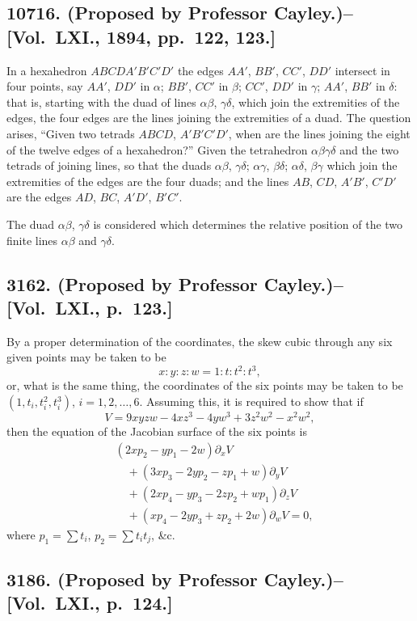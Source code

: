 \documentclass[11pt,a4paper]{article}
\theoremstyle{definition}
\begin{document}
\subsection*{10716. (Proposed by Professor Cayley.)\---[Vol.~LXI., 1894, pp.~122, 123.]}

In a hexahedron $ABCDA'B'C'D'$ the edges $AA'$, $BB'$, $CC'$, $DD'$ intersect in four points, say $AA'$, $DD'$ in $\alpha$; $BB'$, $CC'$ in $\beta$; $CC'$, $DD'$ in $\gamma$; $AA'$, $BB'$ in $\delta$: that is, starting with the duad of lines $\alpha\beta$, $\gamma\delta$, which join the extremities of the edges, the four edges are the lines joining the extremities of a duad. The question arises, ``Given two tetrads $ABCD$, $A'B'C'D'$, when are the lines joining the eight of the twelve edges of a hexahedron?'' Given the tetrahedron $\alpha\beta\gamma\delta$ and the two tetrads of joining lines, so that the duads $\alpha\beta$, $\gamma\delta$; $\alpha\gamma$, $\beta\delta$; $\alpha\delta$, $\beta\gamma$ which join the extremities of the edges are the four duads; and the lines $AB$, $CD$, $A'B'$, $C'D'$ are the edges $AD$, $BC$, $A'D'$, $B'C'$.

The duad $\alpha\beta$, $\gamma\delta$ is considered which determines the relative position of the two finite lines $\alpha\beta$ and $\gamma\delta$.

\subsection*{3162. (Proposed by Professor Cayley.)\---[Vol.~LXI., p.~123.]}

By a proper determination of the coordinates, the skew cubic through any six given points may be taken to be
\[
x:y:z:w = 1:t:t^2:t^3,
\]
or, what is the same thing, the coordinates of the six points may be taken to be $(1,t_i,t_i^2,t_i^3)$, $i=1,2,\ldots,6$. Assuming this, it is required to show that if
\[
V = 9xyzw - 4xz^3 - 4yw^3 + 3z^2w^2 - x^2w^2,
\]
then the equation of the Jacobian surface of the six points is
\[
\begin{aligned}
&(2xp_2-yp_1-2w)\partial_xV \\
&\quad + (3xp_3-2yp_2-zp_1+w)\partial_yV \\
&\quad + (2xp_4-yp_3-2zp_2+wp_1)\partial_zV \\
&\quad + (xp_4-2yp_3+zp_2+2w)\partial_wV = 0,
\end{aligned}
\]
where $p_1=\sum t_i$, $p_2=\sum t_it_j$, \&c.

\subsection*{3186. (Proposed by Professor Cayley.)\---[Vol.~LXI., p.~124.]}
\end{document}

